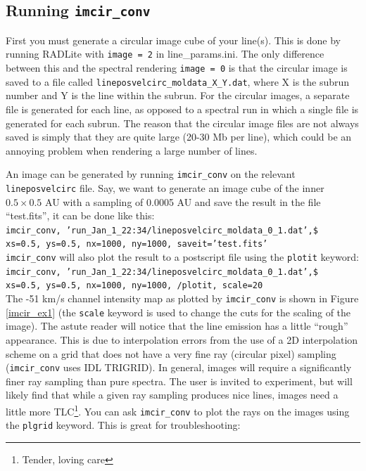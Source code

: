 \documentclass[11pt]{article}
\begin{document}
\subsection{Running {\tt imcir\_conv}}

First you must generate a circular image cube of your line(s). This is done by running RADLite with {\tt image = 2} in line\_params.ini. The
only difference between this and the spectral rendering {\tt image = 0} is that the circular image is saved to a file called 
{\tt lineposvelcirc\_moldata\_X\_Y.dat}, where X is the subrun number and Y is the line within the subrun. For the circular images, 
a separate file is generated for each line, as opposed to a spectral run in which a single file is generated for each subrun. The reason that the
circular image files are not always saved is simply that they are quite large (20-30 Mb per line), which could be an annoying 
problem when rendering a large number of lines.  

An image can be generated by running {\tt imcir\_conv} on the relevant {\tt lineposvelcirc} file. Say, we want to generate an image cube of the inner 
$0.5\times 0.5$ AU with a sampling of 0.0005 AU and save the result in the file ``test.fits'', it can be done like this:\\

{\tt imcir\_conv, 'run\_Jan\_1\_22:34/lineposvelcirc\_moldata\_0\_1.dat',\$\\
xs=0.5, ys=0.5, nx=1000, ny=1000, saveit='test.fits'}\\

{\tt imcir\_conv} will also plot the result to a postscript file using the {\tt plotit} keyword:\\

{\tt imcir\_conv, 'run\_Jan\_1\_22:34/lineposvelcirc\_moldata\_0\_1.dat',\$\\
 xs=0.5, ys=0.5, nx=1000, ny=1000, /plotit, scale=20}\\

The -51 km/s channel intensity map as plotted by {\tt imcir\_conv} is shown in Figure \ref{imcir_ex1} (the {\tt scale} keyword is used
to change the cuts for the scaling of the image). The astute reader will notice that the line emission has 
a little ``rough'' appearance. This is due to interpolation errors from the use of a 2D interpolation scheme on a grid that
does not have a very fine ray (circular pixel) sampling ({\tt imcir\_conv} uses
IDL TRIGRID). In general, images will require a significantly finer ray sampling than pure spectra. The user is invited to experiment, but will
likely find that while a given ray sampling produces nice lines, images need a little more TLC\footnote{Tender, loving care}. You can ask
{\tt imcir\_conv} to plot the rays on the images using the {\tt plgrid} keyword. This is great for troubleshooting: \\
\end{document}
